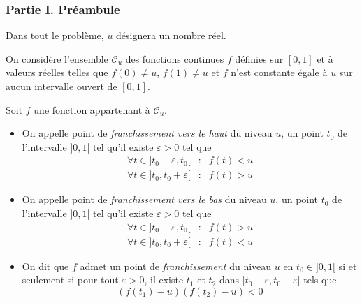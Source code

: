 \subsubsection*{Partie I. Pr{\'e}ambule}

Dans tout le probl{\`e}me, $u$ d{\'e}signera un nombre r{\'e}el.

On consid{\`e}re l'ensemble $\mathcal{C}_{u}$ des fonctions
continues $f$ d{\'e}finies sur $[ 0,1] $ et {\`a} valeurs
r{\'e}elles telles que $f(0)\neq u$, $f(1)\neq u$ et $f$ n'est
constante {\'e}gale {\`a} $u$ sur aucun intervalle ouvert de $[
0,1] $.

Soit $f$ une fonction appartenant {\`a} $\mathcal{C}_{u}$.

\begin{itemize}
\item  On appelle point de \emph{franchissement vers le haut} du niveau $u$,
un point $t_{0}$ de l'intervalle $] 0,1[ $ tel qu'il existe $%
\varepsilon >0$ tel que
\begin{eqnarray*}
\forall t \in ] t_{0}-\varepsilon ,t_{0}[ &:& f(t)<u \\
\forall t \in ] t_{0},t_{0}+\varepsilon [ &:& f(t)>u
\end{eqnarray*}

\item  On appelle point de \emph{franchissement vers le bas} du niveau $u$,
un point $t_{0}$ de l'intervalle $] 0,1[ $ tel qu'il existe $%
\varepsilon >0$ tel que
\begin{eqnarray*}
\forall t \in ] t_{0}-\varepsilon ,t_{0}[ &:& f(t)>u \\
\forall t \in ] t_{0},t_{0}+\varepsilon [ &:& f(t)<u
\end{eqnarray*}

\item  On dit que $f$ admet un point de \emph{franchissement }du niveau $u$
en $t_{0}\in ] 0,1[ $ si et seulement si pour tout $\varepsilon >0
$, il existe $t_{1}$ et $t_{2}$ dans $] t_{0}-\varepsilon
,t_{0}+\varepsilon [ $ tels que
\[
(f(t_{1})-u)(f(t_{2})-u)<0
\]
\end{itemize}

